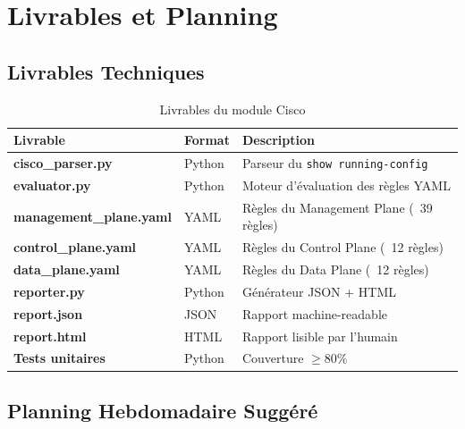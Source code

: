 \documentclass[12pt, a4paper]{report}
\begin{document}
\chapter{Livrables et Planning}

\section{Livrables Techniques}

\begin{table}[H]
  \centering
  \caption{Livrables du module Cisco}
  \begin{tabularx}{\textwidth}{>{\bfseries}l l X}
    \toprule
    \rowcolor{tableHeader}\color{white}\textbf{Livrable} & \color{white}\textbf{Format} & \color{white}\textbf{Description} \\
    \midrule
    \rowcolor{tableRowA} cisco\_parser.py & Python & Parseur du \texttt{show running-config} \\
    \rowcolor{tableRowB} evaluator.py & Python & Moteur d'évaluation des règles YAML \\
    \rowcolor{tableRowA} management\_plane.yaml & YAML & Règles du Management Plane (~39 règles) \\
    \rowcolor{tableRowB} control\_plane.yaml & YAML & Règles du Control Plane (~12 règles) \\
    \rowcolor{tableRowA} data\_plane.yaml & YAML & Règles du Data Plane (~12 règles) \\
    \rowcolor{tableRowB} reporter.py & Python & Générateur JSON + HTML \\
    \rowcolor{tableRowA} report.json & JSON & Rapport machine-readable \\
    \rowcolor{tableRowB} report.html & HTML & Rapport lisible par l'humain \\
    \rowcolor{tableRowA} Tests unitaires & Python & Couverture $\geq 80\%$ \\
    \bottomrule
  \end{tabularx}
\end{table}

\section{Planning Hebdomadaire Suggéré}
\end{document}
